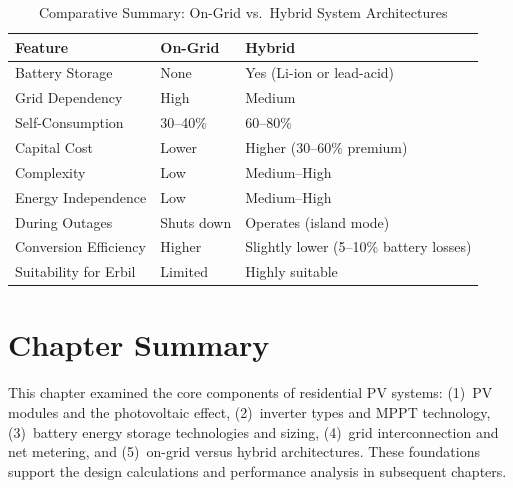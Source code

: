 \begin{table}[H]
\centering
\caption{Comparative Summary: On-Grid vs.\ Hybrid System Architectures}
\label{tab:architecture_comparison}
\small
\begin{tabular}{@{}p{4cm} p{4.5cm} p{4.5cm}@{}}
\toprule
\textbf{Feature} & \textbf{On-Grid} & \textbf{Hybrid} \\
\midrule
Battery Storage & None & Yes (Li-ion or lead-acid) \\
Grid Dependency & High & Medium \\
Self-Consumption & 30--40\% & 60--80\% \\
Capital Cost & Lower & Higher (30--60\% premium) \\
Complexity & Low & Medium--High \\
Energy Independence & Low & Medium--High \\
During Outages & Shuts down & Operates (island mode) \\
Conversion Efficiency & Higher & Slightly lower (5--10\% battery losses) \\
Suitability for Erbil & Limited & Highly suitable \\
\bottomrule
\end{tabular}
\end{table}


\section{Chapter Summary}

This chapter examined the core components of residential PV systems: (1)~PV modules and the photovoltaic effect, (2)~inverter types and MPPT technology, (3)~battery energy storage technologies and sizing, (4)~grid interconnection and net metering, and (5)~on-grid versus hybrid architectures. These foundations support the design calculations and performance analysis in subsequent chapters.
